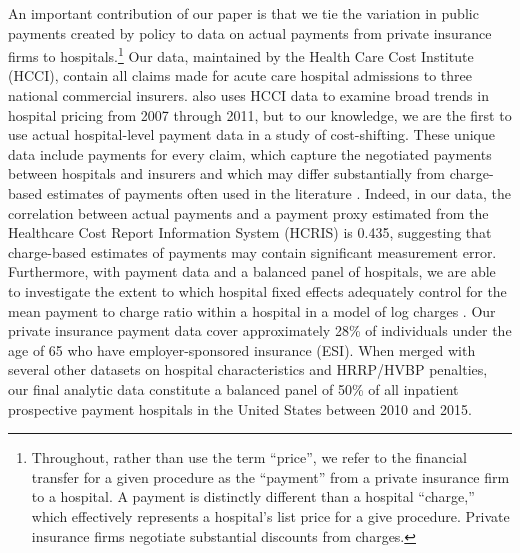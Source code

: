 \documentclass[12pt]{article}
\begin{document}
An important contribution of our paper is that we tie the variation in public payments created by policy to data on actual payments from private insurance firms to hospitals.\footnote{Throughout, rather than use the term ``price'', we refer to the financial transfer for a given procedure as the ``payment'' from a private insurance firm to a hospital.  A payment is distinctly different than a hospital ``charge,'' which effectively represents a hospital's list price for a give procedure. Private insurance firms negotiate substantial discounts from charges.}  Our data, maintained by the Health Care Cost Institute (HCCI), contain all claims made for acute care hospital admissions to three national commercial insurers. \cite{cooper2015} also uses HCCI data to examine broad trends in hospital pricing from 2007 through 2011, but to our knowledge, we are the first to use actual hospital-level payment data in a study of cost-shifting. These unique data include payments for every claim, which capture the negotiated payments between hospitals and insurers and which may differ substantially from charge-based estimates of payments often used in the literature \citep{dafny2009,dranove2017}. Indeed, in our data, the correlation between actual payments and a payment proxy estimated from the Healthcare Cost Report Information System (HCRIS) is 0.435, suggesting that charge-based estimates of payments may contain significant measurement error.  Furthermore, with payment data and a balanced panel of hospitals, we are able to investigate the extent to which hospital fixed effects adequately control for the mean payment to charge ratio within a hospital in a model of log charges \citep{cutler2000}. Our private insurance payment data cover approximately 28\% of individuals under the age of 65 who have employer-sponsored insurance (ESI). When merged with several other datasets on hospital characteristics and HRRP/HVBP penalties, our final analytic data constitute a balanced panel of 50\% of all inpatient prospective payment hospitals in the United States between 2010 and 2015.
\end{document}
